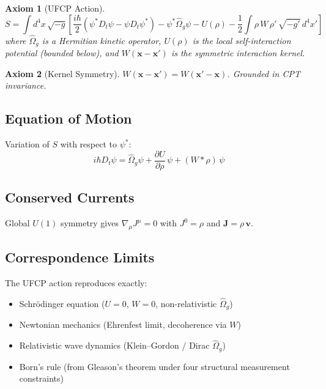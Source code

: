 \documentclass[11pt, a4paper]{article}
\newtheorem{axiom}{Axiom}[section]
\begin{document}
\begin{axiom}[UFCP Action]
\label{ax:action}
\begin{equation}
  \boxed{
  S = \int d^4x\, \sqrt{-g} \left[
    \frac{i\hbar}{2}\!\left(\psi^* D_t\psi - \psi D_t\psi^*\right)
    - \psi^* \hat{\Omega}_g \psi
    - U(\rho)
    - \frac{1}{2}\int \rho\, W\, \rho'\, \sqrt{-g'}\, d^4x'
  \right]
  }
\end{equation}
where $\hat{\Omega}_g$ is a Hermitian kinetic operator, $U(\rho)$
is the local self-interaction potential (bounded below), and
$W(\mathbf{x}-\mathbf{x}')$ is the symmetric interaction kernel.
\end{axiom}

\begin{axiom}[Kernel Symmetry]
\label{ax:kernel-sym}
$W(\mathbf{x}-\mathbf{x}') = W(\mathbf{x}'-\mathbf{x})$.
Grounded in CPT invariance.
\end{axiom}

\subsection{Equation of Motion}

Variation of $S$ with respect to $\psi^*$:
\begin{equation}
  \boxed{
  i\hbar D_t \psi = \hat{\Omega}_g \psi
    + \frac{\partial U}{\partial \rho}\,\psi
    + (W * \rho)\,\psi
  }
\end{equation}

\subsection{Conserved Currents}

Global $U(1)$ symmetry gives $\nabla_\mu J^\mu = 0$ with
$J^0 = \rho$ and $\mathbf{J} = \rho\,\mathbf{v}$.

\subsection{Correspondence Limits}

The UFCP action reproduces exactly:
\begin{itemize}[nosep]
  \item Schr\"odinger equation ($U = 0$, $W = 0$, non-relativistic
    $\hat{\Omega}_g$)
  \item Newtonian mechanics (Ehrenfest limit, decoherence via $W$)
  \item Relativistic wave dynamics (Klein--Gordon / Dirac
    $\hat{\Omega}_g$)
  \item Born's rule (from Gleason's theorem under four structural
    measurement constraints)
\end{itemize}
\end{document}
